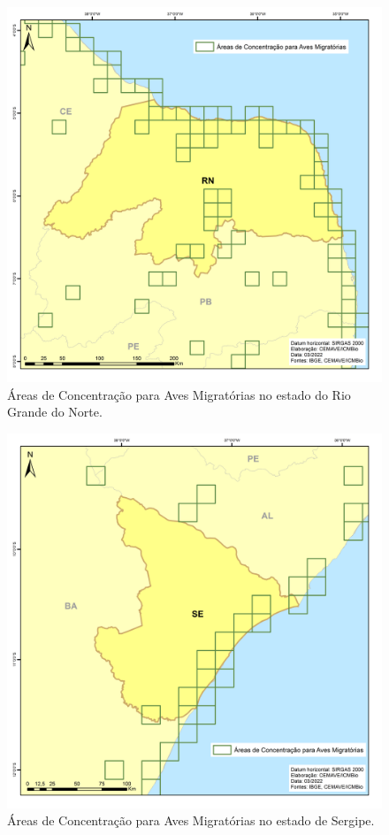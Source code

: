 \documentclass[
  oneside]{scrbook}
\begin{document}
\begin{figure}[H]

{\centering \includegraphics[width=0.75\linewidth]{imagens/cap07/Figura_7.18_RN} 

}

\caption{Áreas de Concentração para Aves Migratórias no estado do Rio Grande do Norte.}\label{fig:38}
\end{figure}

\begin{figure}[H]

{\centering \includegraphics[width=0.75\linewidth]{imagens/cap07/Figura_7.19_SE} 

}

\caption{Áreas de Concentração para Aves Migratórias no estado de Sergipe.}\label{fig:39}
\end{figure}
\end{document}
